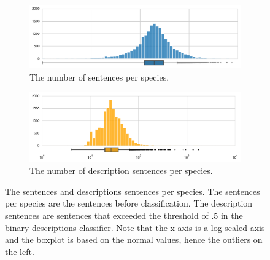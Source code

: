 \documentclass[a4paper, 12pt, oneside]{book} %
\begin{document}
\begin{figure} [h!]
     \centering
     \begin{subfigure}[b]{1\textwidth}
         \centering
         \includegraphics[width=\textwidth]{figures/text_distribution_1.pdf}
         \caption{The number of sentences per species.}
         \label{fig:text_distribution_1}
     \end{subfigure}
     \vfill
     \begin{subfigure}[b]{1\textwidth}
         \centering
         \includegraphics[width=\textwidth]{figures/text_distribution_2.pdf}
         \caption{The number of description sentences per species.}
         \label{fig:text_distribution_2}
     \end{subfigure}
     \caption[The sentences and descriptions sentences per species]{The sentences and descriptions sentences per species. The sentences per species are the sentences before classification. The description sentences are sentences that exceeded the threshold of .5 in the binary descriptions classifier. Note that the x-axis is a log-scaled axis and the boxplot is based on the normal values, hence the outliers on the left.}
     \label{fig:text_distribution}
\end{figure}




\end{document}

